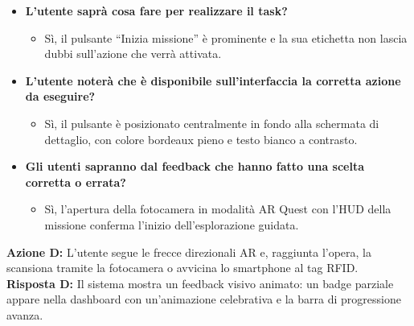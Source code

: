 \begin{itemize}[nosep, leftmargin=1.6em]
    \item \textbf{L'utente saprà cosa fare per realizzare il task?}
    \begin{itemize}[nosep, leftmargin=1.6em]
        \item Sì, il pulsante ``Inizia missione'' è prominente e la sua etichetta non lascia dubbi sull'azione che verrà attivata.
    \end{itemize}
    \item \textbf{L'utente noterà che è disponibile sull'interfaccia la corretta azione da eseguire?}
    \begin{itemize}[nosep, leftmargin=1.6em]
        \item Sì, il pulsante è posizionato centralmente in fondo alla schermata di dettaglio, con colore bordeaux pieno e testo bianco a contrasto.
    \end{itemize}
    \item \textbf{Gli utenti sapranno dal feedback che hanno fatto una scelta corretta o errata?}
    \begin{itemize}[nosep, leftmargin=1.6em]
        \item Sì, l'apertura della fotocamera in modalità AR Quest con l'HUD della missione conferma l'inizio dell'esplorazione guidata.
    \end{itemize}
\end{itemize}

\vspace{0.3cm}
\noindent\textbf{Azione D:} L'utente segue le frecce direzionali AR e, raggiunta l'opera, la scansiona tramite la fotocamera o avvicina lo smartphone al tag RFID.\\
\textbf{Risposta D:} Il sistema mostra un feedback visivo animato: un badge parziale appare nella dashboard con un'animazione celebrativa e la barra di progressione avanza.

